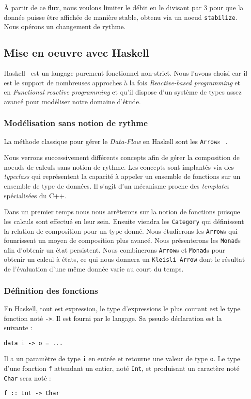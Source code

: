 \documentclass{llncs}
\newcommand{\DF}{\emph{Data-Flow} }
\newcommand{\RP}{\emph{Reactive-based programming} }
\newcommand{\FRP}{\emph{Functional reactive programming} }
\newcommand{\Arrs}{\lstinline{Arrow}s }
\begin{document}
À partir de ce flux, nous voulons limiter le débit en le divisant par 3 pour
que la donnée puisse être affichée de manière stable, obtenu via un noeud \lstinline{stabilize}.
Nous opérons un changement de rythme.

\subsection{Mise en oeuvre avec Haskell}
Haskell~\cite{Haskell10} est un langage purement fonctionnel non-strict.
Nous l'avons choisi car il est le support de nombreuses approches à la fois \RP
et en \FRP et qu'il dispose d'un système de types assez avancé pour modéliser
notre domaine d'étude.

\subsubsection{Modélisation sans notion de rythme}
La méthode classique pour gérer le \DF en Haskell sont les \Arrs~\cite{Hughes00}.

Nous verrons successivement différents concepts afin de gérer la composition de
noeuds de calculs sans notion de rythme.
Les concepts sont implantés via des \emph{typeclass} qui représentent la capacité à appeler un ensemble
de fonctions sur un ensemble de type de données.
Il s'agit d'un mécanisme proche des \emph{template}s spécialisées du C++.

Dans un premier temps nous nous arrêterons sur la notion de fonctions puisque
les calculs sont effectué en leur sein.
Ensuite viendra les \lstinline{Category} qui définissent la relation de composition
pour un type donné.
Nous étudierons les \Arrs qui founrissent un moyen de composition plus avancé.
Nous présenterons les \lstinline{Monad}s afin d'obtenir un état persistent.
Nous combinerons \Arrs et \lstinline{Monad}s pour obtenir un calcul à états, ce
qui nous donnera un \lstinline{Kleisli Arrow} dont le résultat de l'évaluation
d'une même donnée varie au court du temps.

\subsubsection{Définition des fonctions}
En Haskell, tout est expression, le type d'expressions le plus courant est le type
fonction noté \lstinline{->}.
Il est fourni par le langage.
Sa pseudo déclaration est la suivante :
\begin{lstlisting}
data i -> o = ...
\end{lstlisting}
Il a un paramètre de type \lstinline{i} en entrée et retourne une
valeur de type \lstinline{o}.
Le type d'une fonction \lstinline{f} attendant un entier, noté \lstinline{Int}, et
produisant un caractère noté \lstinline{Char} sera noté :
\begin{lstlisting}
f :: Int -> Char
\end{lstlisting}
\end{document}
